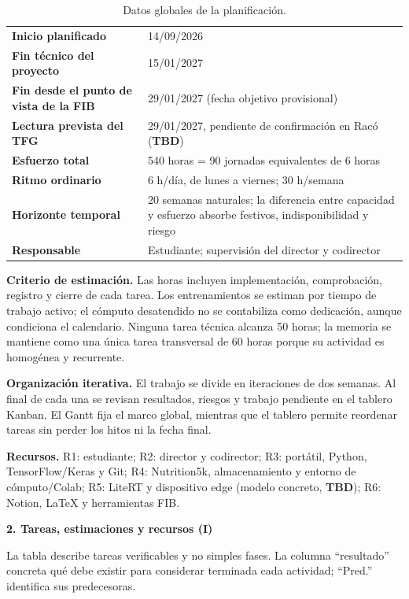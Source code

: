 \documentclass[10pt,a4paper]{article}
\newcommand{\tbd}{\textbf{TBD}}
\begin{document}
\begin{table}[h]
\centering
\caption{Datos globales de la planificación.}
\small
\begin{tabularx}{\textwidth}{>{\bfseries}L{4.0cm}Y}
\toprule
Inicio planificado & 14/09/2026 \\
Fin técnico del proyecto & 15/01/2027 \\
Fin desde el punto de vista de la FIB & 29/01/2027 (fecha objetivo provisional) \\
Lectura prevista del TFG & 29/01/2027, pendiente de confirmación en Racó (\tbd) \\
Esfuerzo total & 540 horas = 90 jornadas equivalentes de 6 horas \\
Ritmo ordinario & 6 h/día, de lunes a viernes; 30 h/semana \\
Horizonte temporal & 20 semanas naturales; la diferencia entre capacidad y esfuerzo absorbe festivos, indisponibilidad y riesgo \\
Responsable & Estudiante; supervisión del director y codirector \\
\bottomrule
\end{tabularx}
\end{table}

\textbf{Criterio de estimación.} Las horas incluyen implementación, comprobación, registro y cierre de cada tarea. Los entrenamientos se estiman por tiempo de trabajo activo; el cómputo desatendido no se contabiliza como dedicación, aunque condiciona el calendario. Ninguna tarea técnica alcanza 50 horas; la memoria se mantiene como una única tarea transversal de 60 horas porque su actividad es homogénea y recurrente.

\textbf{Organización iterativa.} El trabajo se divide en iteraciones de dos semanas. Al final de cada una se revisan resultados, riesgos y trabajo pendiente en el tablero Kanban. El Gantt fija el marco global, mientras que el tablero permite reordenar tareas sin perder los hitos ni la fecha final.

\textbf{Recursos.} R1: estudiante; R2: director y codirector; R3: portátil, Python, TensorFlow/Keras y Git; R4: Nutrition5k, almacenamiento y entorno de cómputo/Colab; R5: LiteRT y dispositivo edge (modelo concreto, \tbd); R6: Notion, LaTeX y herramientas FIB.

\newpage
{\color{deepblue}\Large\bfseries 2. Tareas, estimaciones y recursos (I)}

\vspace{0.2em}
La tabla describe tareas verificables y no simples fases. La columna ``resultado'' concreta qué debe existir para considerar terminada cada actividad; ``Pred.'' identifica sus predecesoras.
\end{document}
